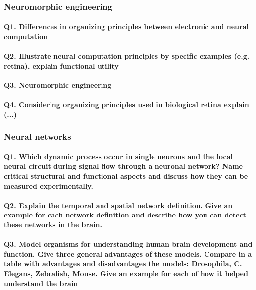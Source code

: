 \documentclass[12pt,article,oneside,a4paper]{memoir}
\begin{document}
\subsubsection{Neuromorphic engineering}

\paragraph{Q1. Differences in organizing principles between electronic and neural computation}

\paragraph{Q2. Illustrate neural computation principles by specific examples (e.g. retina), explain functional utility}

\paragraph{Q3. Neuromorphic engineering}

\paragraph{Q4. Considering organizing principles used in biological retina explain (...)}

\subsubsection{Neural networks}
\paragraph{Q1. Which dynamic process occur in single neurons and the local neural circuit during signal flow through a neuronal network? Name critical structural and functional aspects and discuss how they can be measured experimentally.}

\paragraph{Q2. Explain the temporal and spatial network definition. Give an example for each network definition and describe how you can detect these networks in the brain.}

\paragraph{Q3. Model organisms for understanding human brain development and function. Give three general advantages of these models. Compare in a table with advantages and disadvantages the models: Drosophila, C. Elegans, Zebrafish, Mouse. Give an example for each of how it helped understand the brain}
\end{document}

